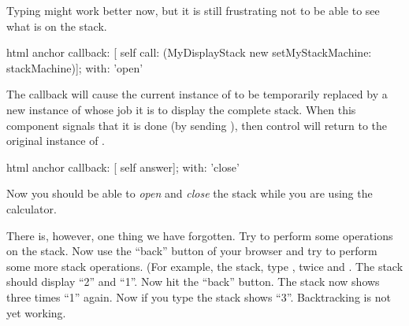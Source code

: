 \documentclass[a4paper,10pt,twoside]{book}
\begin{document}
Typing might work better now, but it is still frustrating not to be able to see what is on the stack.


\begin{code}{}
html anchor
	callback: [ self call: (MyDisplayStack new setMyStackMachine: stackMachine)];
	with: 'open'
\end{code}


The callback will cause the current instance of  to be temporarily replaced by a new instance of  whose job it is to display the complete stack.
When this component signals that it is done (\ie by sending ), then control will return to the original instance of .


\begin{code}{}
html anchor
	callback: [ self answer];
	with: 'close'
\end{code}

Now you should be able to \emph{open} and \emph{close} the stack while you are using the calculator.

There is, however, one thing we have forgotten.
Try to perform some operations on the stack.
Now use the ``back'' button of your browser and try to perform some more stack operations.
(For example,  the stack, type ,  twice and \menu {+}.
The stack should display ``2'' and ``1''.
Now hit the ``back'' button.
The stack now shows three times ``1'' again.
Now if you type \menu{+} the stack shows ``3''.
Backtracking is not yet working.

\end{document}

